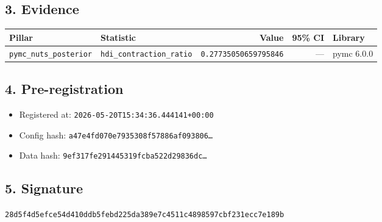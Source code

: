 \documentclass{article}
\begin{document}
\subsection*{3. Evidence}
\begin{tabular}{llrrl}\toprule
\textbf{Pillar} & \textbf{Statistic} & \textbf{Value} & \textbf{95\% CI} & \textbf{Library} \\\midrule
\texttt{pymc\_nuts\_posterior} & \texttt{hdi\_contraction\_ratio} & \texttt{0.27735050659795846} & --- & pymc 6.0.0 \\
\bottomrule\end{tabular}
\subsection*{4. Pre-registration}
\begin{itemize}
\item Registered at: \texttt{2026-05-20T15:34:36.444141+00:00}
\item Config hash: \texttt{a47e4fd070e7935308f57886af093806\dots}
\item Data hash: \texttt{9ef317fe291445319fcba522d29836dc\dots}
\end{itemize}
\subsection*{5. Signature}
\texttt{28d5f4d5efce54d410ddb5febd225da389e7c4511c4898597cbf231ecc7e189b}\\
\end{document}
